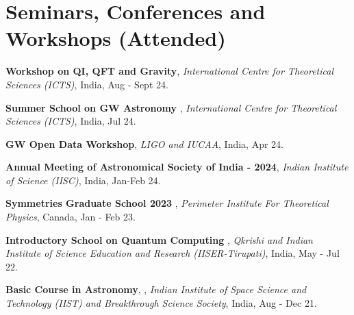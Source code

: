 \section{Seminars, Conferences and Workshops (Attended)}

    \begin{highlights}
        \item \textbf{Workshop on QI, QFT and Gravity}, \textit{International Centre for Theoretical Sciences (ICTS)}, India, Aug - Sept 24.
        \vspace{0.10 cm}
        \item \textbf{Summer School on GW Astronomy} \href{https://drive.google.com/file/d/1A4wjyG5oh1j9Ev0P8PrFfCE6qrSeY_OG/view?usp=sharing}{\faExternalLink}, \textit{International Centre for Theoretical Sciences (ICTS)}, India, Jul 24. 
        \vspace{0.10 cm}
        \item \textbf{GW Open Data Workshop}, \textit{LIGO and IUCAA}, India, Apr 24.
        \vspace{0.10 cm}
        \item \textbf{Annual Meeting of Astronomical Society of India - 2024}, \textit{Indian Institute of Science (IISC)}, India, Jan-Feb 24.
        \vspace{0.10 cm}
        \item \textbf{Symmetries Graduate School 2023} \href{https://drive.google.com/file/d/1Ssg3t8U1qMG-CfZB_SNKmXhd5SYfzncT/view?usp=sharing}{\faExternalLink}, \textit{Perimeter Institute For Theoretical Physics}, Canada, Jan - Feb 23.
        \vspace{0.10 cm}
        \item \textbf{Introductory School on Quantum Computing} \href{https://drive.google.com/file/d/1tPozwrpQxlXFjV8H_1BRr3dISs3FuA1G/view?usp=sharing}{\faExternalLink}, \textit{Qkrishi and Indian Institute of Science Education and Research (IISER-Tirupati)}, India, May - Jul 22.
        \vspace{0.10 cm}
        \item \textbf{Basic Course in Astronomy}, \href{https://drive.google.com/file/d/1AgTOREFceg1VODveCYEeppvI-02fJd_m/view?usp=sharing}{\faExternalLink}, \textit{Indian Institute of Space Science and Technology (IIST) and Breakthrough Science Society}, India, Aug - Dec 21.
    \end{highlights}
    

